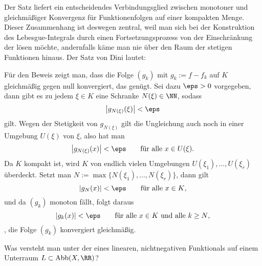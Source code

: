 \begin{antwort}
  Der Satz liefert ein entscheidendes Verbindungsglied zwischen 
  monotoner und gleichm\"a{\ss}iger Konvergenz f\"ur Funktionenfolgen 
  auf einer kompakten Menge. Dieser Zusammenhang ist deswegen zentral, 
  weil man sich bei der Konstruktion des Lebesgue-Integrals durch einen 
  Fortsetzungsprozess von der Einschränkung der  lösen möchte, andernfalls käme man nie über den Raum der 
  stetigen Funktionen hinaus. Der Satz von Dini lautet:

  \medskip\noindent

  \medskip 
  Für den Beweis zeigt man, dass die Folge $(g_k)$ mit 
  $g_k := f - f_k$ auf $K$ gleichmäßig gegen null konvergiert, das genügt. 
  Sei dazu $\eps>0$ vorgegeben,  dann gibt es zu jedem $\xi\in K$ 
  eine Schranke $N(\xi) \in \NN$, sodass 
  \[
  \left| g_{N(\xi)} (\xi) \right| < \eps
  \]
  gilt. Wegen der Stetigkeit von $g_{N(\xi)}$ gilt die Ungleichung 
  auch noch in einer Umgebung $U(\xi)$ von $\xi$, also hat man
  \[
  \left| g_{N(\xi)} (x) \right| < \eps \qquad\text{für alle $x\in U(\xi)$}. 
  \]
  Da $K$ kompakt ist, wird $K$ von endlich vielen Umgebungen 
  $U(\xi_1),\ldots,U(\xi_r)$ überdeckt. Setzt man 
  $N:=\max\{ N(\xi_1),\ldots, N(\xi_r) \}$, dann gilt 
  \[
  \left| g_N (x) \right| < \eps \qquad\text{für alle $x\in K$}, 
  \]
  und da $(g_k)$ monoton fällt, folgt daraus 
  \[
  \left| g_k (x) \right| < \eps 
  \qquad\text{für alle $x\in K$ und alle $k\ge N$},
  \]
  {\dasheisst}, die Folge $(g_k)$ konvergiert gleichmäßig. 
  \AntEnd
\end{antwort}

\begin{frage}\label{11_sigma}
  Was versteht man unter der  
  eines linearen, nichtnegativen Funktionals auf einem Unterraum 
  $L \subset \mathrm{Abb}(X,\RR)$?
\end{frage}

